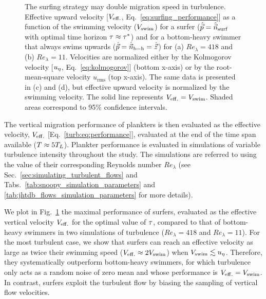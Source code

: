 \begin{figure}[p]
	\centering
	
	\caption[The surfing strategy may double migration speed in turbulence.]{
		The surfing strategy may double migration speed in turbulence.
		Effective upward velocity [$V_{\mathrm{eff.}}$, Eq.~\eqref{eq:surfing_performance}] as a function of the swimming velocity ($V_{\mathrm{swim}}$) for a surfer ($\hat{\vec{p}}=\hat{\vec{n}}_{\mathrm{surf}}$ with optimal time horizon $\tau \approx \tau^*$) and for a bottom-heavy swimmer that always swims upwards ($\hat{\vec{p}}=\hat{\vec{n}}_{\mathrm{b-h}}=\hat{\vec{z}}$) for (a) $\mathit{Re}_{\lambda} = 418$ and (b) $\mathit{Re}_{\lambda} = 11$.
		Velocities are normalized either by the Kolmogorov velocity [$u_{\eta}$, Eq.~\eqref{eq:kolmogorov}] (bottom x-axis) or by the root-mean-square velocity $u_{\mathrm{rms}}$ (top x-axis).
		The same data is presented in (c) and (d), but effective upward velocity is normalized by the swimming velocity.
		The solid line represents $V_{\mathrm{eff.}} = V_{\mathrm{swim}}$. Shaded areas correspond to 95\% confidence intervals.
	}
	\label{fig:surfing_main_results}
\end{figure}
The vertical migration performance of plankters is then evaluated as the effective velocity, $V_{\mathrm{eff.}}$ [Eq.~\eqref{turb:eq:performance}], evaluated at the end of the time span available ($T \approx 5 T_L$).
Plankter performance is evaluated in simulations of variable turbulence intensity throughout the study.
The simulations are referred to using the value of their corresponding Reynolds number $\mathit{Re}_{\lambda}$ (see Sec.~\ref{sec:simulating_turbulent_flows} and Tabs.~\ref{tab:snoopy_simulation_parameters} and \ref{tab:jhtdb_flows_simulation_parameters} for more details).

We plot in Fig.~\ref{fig:surfing_main_results} the maximal performance of surfers, evaluated as the effective vertical velocity $V_{\mathrm{eff.}}$ for the optimal value of $\tau$, compared to that of bottom-heavy swimmers in two simulations of turbulence ($\mathit{Re}_{\lambda} = 418$ and $\mathit{Re}_{\lambda} = 11$).
For the most turbulent case, we show that surfers can reach an effective velocity as large as twice their swimming speed ($V_{\mathrm{eff.}} \approx 2 V_{\mathrm{swim}}$) when $V_{\mathrm{swim}} \lesssim u_{\eta}$.
Therefore, they systematically outperform bottom-heavy swimmers, for which turbulence only acts as a random noise of zero mean and whose performance is $V_{\mathrm{eff.}} = V_{\mathrm{swim}}$.
In contrast, surfers exploit the turbulent flow by biasing the sampling of vertical flow velocities.

